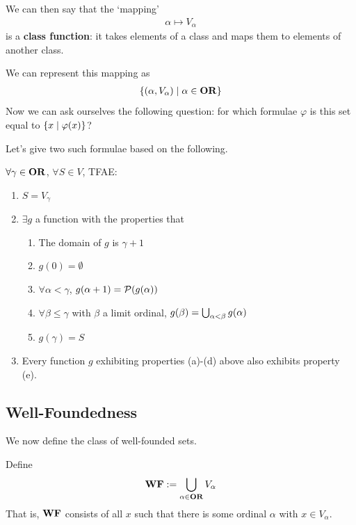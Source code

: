 We can then say that the `mapping'
\begin{align*}
    \alpha \mapsto V_{\alpha}
\end{align*}
is a \textbf{class function}: it takes elements of a class and maps them to elements of another class.

We can represent this mapping as
\begin{align*}
    \left\{ \left( \alpha, V_{\alpha} \right) \; \middle\vert \; \alpha \in \mathbf{OR} \right\}
\end{align*}
Now we can ask ourselves the following question: for which formulae $\varphi$ is this set equal to $\left\{ x \; \middle\vert \; \varphi(x) \right\}$?

Let's give two such formulae based on the following.

\begin{boxtheorem}
    $\forall \gamma \in \mathbf{OR}$, $\forall S \in V$, TFAE:
    \begin{enumerate}
        \item $S = V_{\gamma}$
        \item $\exists g$ a function with the properties that
        \begin{enumerate}[label = (\alph*)]
            \item The domain of $g$ is $\gamma + 1$
            \item $g(0) = \emptyset$
            \item $\forall \alpha < \gamma$, $g\!\left( \alpha + 1 \right) = \mathcal{P}\!\left( g\!\left( \alpha \right) \right)$
            \item $\forall \beta \leq \gamma$ with $\beta$ a limit ordinal, $g\!\left( \beta \right) = \bigcup_{\alpha < \beta} g(\alpha)$
            \item $g(\gamma) = S$
        \end{enumerate}
        \item Every function $g$ exhibiting properties (a)-(d) above also exhibits property (e).
    \end{enumerate}
\end{boxtheorem}

\subsection{Well-Foundedness}

We now define the class of well-founded sets.

\begin{boxdefinition}
    Define
    \begin{align*}
        \mathbf{WF} := \bigcup_{\alpha \in \mathbf{OR}} V_{\alpha}
    \end{align*}
    That is, $\mathbf{WF}$ consists of all $x$ such that there is some ordinal $\alpha$ with $x \in V_{\alpha}$.
\end{boxdefinition}

